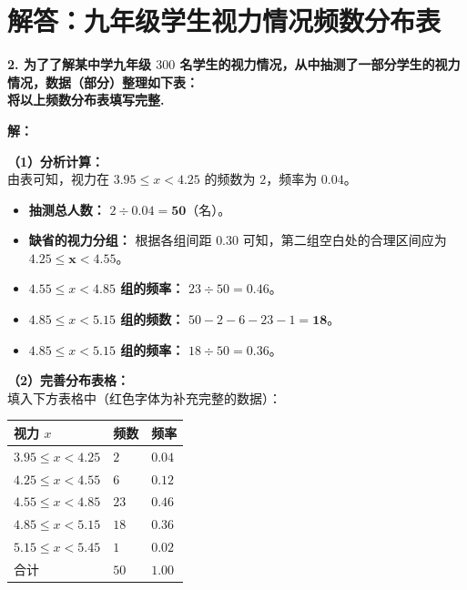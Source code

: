 \newpage



\section{解答：九年级学生视力情况频数分布表}

\vspace{0.6cm}

\textbf{2. 为了了解某中学九年级 $300$ 名学生的视力情况，从中抽测了一部分学生的视力情况，数据（部分）整理如下表：}\\
\textbf{将以上频数分布表填写完整.}

\vspace{0.4cm}

\textbf{解：}

\textbf{（1）分析计算：} \\
由表可知，视力在 $3.95 \leqslant x < 4.25$ 的频数为 $2$，频率为 $0.04$。
\begin{itemize}
  \item \textbf{抽测总人数：} $2 \div 0.04 = \boldsymbol{50}$（名）。
  \item \textbf{缺省的视力分组：} 根据各组间距 $0.30$ 可知，第二组空白处的合理区间应为 $\boldsymbol{4.25 \leqslant x < 4.55}$。
  \item \textbf{$4.55 \leqslant x < 4.85$ 组的频率：} $23 \div 50 = \boldsymbol{0.46}$。
  \item \textbf{$4.85 \leqslant x < 5.15$ 组的频数：} $50 - 2 - 6 - 23 - 1 = \boldsymbol{18}$。
  \item \textbf{$4.85 \leqslant x < 5.15$ 组的频率：} $18 \div 50 = \boldsymbol{0.36}$。
\end{itemize}

\textbf{（2）完善分布表格：} \\
填入下方表格中（红色字体为补充完整的数据）：

\vspace{0.2cm}
\begin{center}
\renewcommand{\arraystretch}{1.5}
\begin{tabular}{|>{\centering\arraybackslash}p{4cm}|>{\centering\arraybackslash}p{3cm}|>{\centering\arraybackslash}p{3cm}|}
  \hline
  \cellcolor{gray!15} 视力 $x$ & \cellcolor{gray!15} 频数 & \cellcolor{gray!15} 频率 \\
  \hline
  $3.95 \leqslant x < 4.25$ & $2$ & $0.04$ \\
  \hline
  \textbf{\textcolor{red!70!black}{$4.25 \leqslant x < 4.55$}} & $6$ & $0.12$ \\
  \hline
  $4.55 \leqslant x < 4.85$ & $23$ & \textbf{\textcolor{red!70!black}{$0.46$}} \\
  \hline
  $4.85 \leqslant x < 5.15$ & \textbf{\textcolor{red!70!black}{$18$}} & \textbf{\textcolor{red!70!black}{$0.36$}} \\
  \hline
  $5.15 \leqslant x < 5.45$ & $1$ & $0.02$ \\
  \hline
  合计 & \textbf{\textcolor{red!70!black}{$50$}} & $1.00$ \\
  \hline
\end{tabular}
\end{center}

